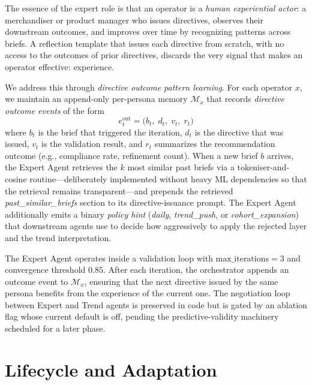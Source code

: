 \documentclass[master,english,final]{postech-ucs}
\begin{document}
The essence of the expert role is that an operator is a \emph{human experiential actor}: a merchandiser or product manager who issues directives, observes their downstream outcomes, and improves over time by recognizing patterns across briefs.
A reflection template that issues each directive from scratch, with no access to the outcomes of prior directives, discards the very signal that makes an operator effective: experience.

We address this through \emph{directive outcome pattern learning}.
For each operator $x$, we maintain an append-only per-persona memory $\mathcal{M}_x$ that records \emph{directive outcome events} of the form
\begin{equation}
    e^{\text{out}}_t = \bigl( b_t,\; d_t,\; v_t,\; r_t \bigr)
\end{equation}
where $b_t$ is the brief that triggered the iteration, $d_t$ is the directive that was issued, $v_t$ is the validation result, and $r_t$ summarizes the recommendation outcome (e.g., compliance rate, refinement count).
When a new brief $b$ arrives, the Expert Agent retrieves the $k$ most similar past briefs via a tokeniser-and-cosine routine---deliberately implemented without heavy ML dependencies so that the retrieval remains transparent---and prepends the retrieved \emph{past\_similar\_briefs} section to its directive-issuance prompt.
The Expert Agent additionally emits a binary \emph{policy hint} (\emph{daily}, \emph{trend\_push}, or \emph{cohort\_expansion}) that downstream agents use to decide how aggressively to apply the rejected layer and the trend interpretation.

The Expert Agent operates inside a validation loop with $\text{max\_iterations} = 3$ and convergence threshold $0.85$.
After each iteration, the orchestrator appends an outcome event to $\mathcal{M}_x$, ensuring that the next directive issued by the same persona benefits from the experience of the current one.
The negotiation loop between Expert and Trend agents is preserved in code but is gated by an ablation flag whose current default is off, pending the predictive-validity machinery scheduled for a later phase.


\section{Lifecycle and Adaptation}
\end{document}
